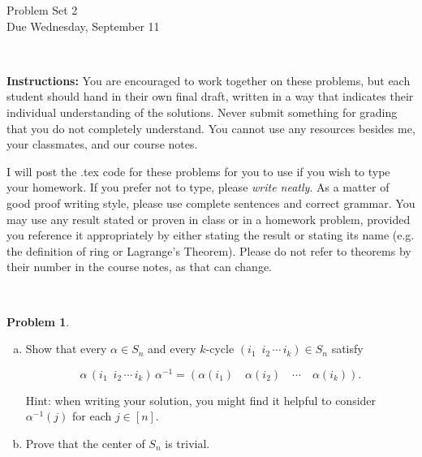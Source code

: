 \documentclass[11pt]{article}
\title{}
\date{\vspace{-0.5in}}
\theoremstyle{definition}
\newtheorem{problem}{Problem}
\begin{document}
\thispagestyle{fancy}
\pagestyle{fancy}

\vspace{3em}

\begin{center}
	{\LARGE Problem Set 2 \\}
	Due Wednesday, September 11
\end{center}

\

\noindent
{\bf Instructions:}
You are encouraged to work together on these problems, but each student should hand in their own final draft, written in a way that indicates their individual understanding of the solutions. Never submit something for grading that you do not completely understand. You cannot use any resources besides me, your classmates, and our course notes.


I will post the .tex code for these problems for you to use if you wish to type your homework. If you prefer not to type, please  {\em write neatly}. As a matter of good proof writing style, please use complete sentences and correct grammar. You may use any result  stated or proven in class or in a homework problem, provided you reference it appropriately by either stating the result or stating its name (e.g. the definition of ring or Lagrange's Theorem). Please do not refer to theorems by their number in the course notes, as that can change.


\




\begin{problem}

\begin{enumerate}[(a)]

\item Show that every $\alpha \in S_n$ and every $k$-cycle $(i_1 \,\,\, i_2 \, \cdots \, i_k)  \in S_n$ satisfy

$$\alpha \, (i_1 \,\,\, i_2 \, \cdots \, i_k) \, \alpha^{-1} =
  (\alpha (i_1) \quad \alpha (i_2) \quad \cdots \quad \alpha (i_k)).$$


\noindent
Hint: when writing your solution, you might find it helpful to consider $\alpha^{-1}(j)$ for each $j \in [n]$.


\item Prove that the center of $S_n$ is trivial.

\end{enumerate}
\end{problem}
\end{document}
